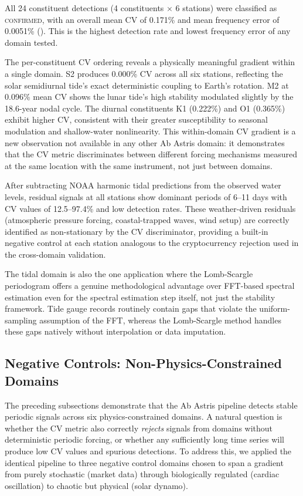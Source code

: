 \documentclass[11pt,a4paper]{article}
\begin{document}
All 24 constituent detections (4 constituents $\times$ 6 stations) were classified as \textsc{confirmed}, with an overall mean CV of 0.171\% and mean frequency error of 0.0051\% (). This is the highest detection rate and lowest frequency error of any domain tested.

The per-constituent CV ordering reveals a physically meaningful gradient within a single domain. S2 produces 0.000\% CV across all six stations, reflecting the solar semidiurnal tide's exact deterministic coupling to Earth's rotation. M2 at 0.096\% mean CV shows the lunar tide's high stability modulated slightly by the 18.6-year nodal cycle. The diurnal constituents K1 (0.222\%) and O1 (0.365\%) exhibit higher CV, consistent with their greater susceptibility to seasonal modulation and shallow-water nonlinearity. This within-domain CV gradient is a new observation not available in any other Ab Astris domain: it demonstrates that the CV metric discriminates between different forcing mechanisms measured at the same location with the same instrument, not just between domains.

After subtracting NOAA harmonic tidal predictions from the observed water levels, residual signals at all stations show dominant periods of 6--11 days with CV values of 12.5--97.4\% and low detection rates. These weather-driven residuals (atmospheric pressure forcing, coastal-trapped waves, wind setup) are correctly identified as non-stationary by the CV discriminator, providing a built-in negative control at each station analogous to the cryptocurrency rejection used in the cross-domain validation.

The tidal domain is also the one application where the Lomb-Scargle periodogram offers a genuine methodological advantage over FFT-based spectral estimation even for the spectral estimation step itself, not just the stability framework. Tide gauge records routinely contain gaps that violate the uniform-sampling assumption of the FFT, whereas the Lomb-Scargle method handles these gaps natively without interpolation or data imputation.

\subsection{Negative Controls: Non-Physics-Constrained Domains}
\label{sec:negative-controls}

The preceding subsections demonstrate that the Ab Astris pipeline detects stable periodic signals across six physics-constrained domains. A natural question is whether the CV metric also correctly \emph{rejects} signals from domains without deterministic periodic forcing, or whether any sufficiently long time series will produce low CV values and spurious detections. To address this, we applied the identical pipeline to three negative control domains chosen to span a gradient from purely stochastic (market data) through biologically regulated (cardiac oscillation) to chaotic but physical (solar dynamo).
\end{document}
